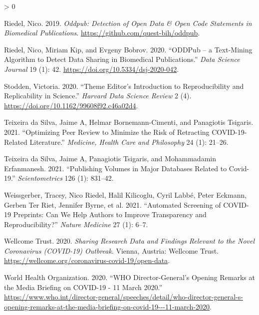 \documentclass[
]{article}
\newlength{\cslhangindent}
\newenvironment{CSLReferences}[2] %
 {%
  \setlength{\parindent}{0pt}
  \ifodd #1 \everypar{\setlength{\hangindent}{\cslhangindent}}\ignorespaces\fi
  \ifnum #2 > 0
  \setlength{\parskip}{#2\baselineskip}
  \fi
 }%
 {}
\begin{document}
\begin{CSLReferences}{1}{0}
\leavevmode\hypertarget{ref-citeODDPubpackage}{}%
Riedel, Nico. 2019. \emph{Oddpub: Detection of Open Data \& Open Code Statements in Biomedical Publications}. \url{https://github.com/quest-bih/oddpub}.

\leavevmode\hypertarget{ref-citePDDPub}{}%
Riedel, Nico, Miriam Kip, and Evgeny Bobrov. 2020. {``ODDPub -- a Text-Mining Algorithm to Detect Data Sharing in Biomedical Publications.''} \emph{Data Science Journal} 19 (1): 42. \url{https://doi.org/10.5334/dsj-2020-042}.

\leavevmode\hypertarget{ref-Stodden2020Theme}{}%
Stodden, Victoria. 2020. {``Theme Editor's Introduction to Reproducibility and Replicability in Science.''} \emph{Harvard Data Science Review} 2 (4). \url{https://doi.org/10.1162/99608f92.c46a02d4}.

\leavevmode\hypertarget{ref-da2021optimizing}{}%
Teixeira da Silva, Jaime A, Helmar Bornemann-Cimenti, and Panagiotis Tsigaris. 2021. {``Optimizing Peer Review to Minimize the Risk of Retracting COVID-19-Related Literature.''} \emph{Medicine, Health Care and Philosophy} 24 (1): 21--26.

\leavevmode\hypertarget{ref-da2021publishing}{}%
Teixeira da Silva, Jaime A, Panagiotis Tsigaris, and Mohammadamin Erfanmanesh. 2021. {``Publishing Volumes in Major Databases Related to Covid-19.''} \emph{Scientometrics} 126 (1): 831--42.

\leavevmode\hypertarget{ref-weissgerber2021automated}{}%
Weissgerber, Tracey, Nico Riedel, Halil Kilicoglu, Cyril Labbé, Peter Eckmann, Gerben Ter Riet, Jennifer Byrne, et al. 2021. {``Automated Screening of COVID-19 Preprints: Can We Help Authors to Improve Transparency and Reproducibility?''} \emph{Nature Medicine} 27 (1): 6--7.

\leavevmode\hypertarget{ref-citeWellcome}{}%
Wellcome Trust. 2020. \emph{Sharing Research Data and Findings Relevant to the Novel Coronavirus (COVID-19) Outbreak}. Vienna, Austria: Wellcome Trust. \url{https://wellcome.org/coronavirus-covid-19/open-data}.

\leavevmode\hypertarget{ref-citeWHOtimeline}{}%
World Health Organization. 2020. {``WHO Director-General's Opening Remarks at the Media Briefing on COVID-19 - 11 March 2020.''} \url{https://www.who.int/director-general/speeches/detail/who-director-general-s-opening-remarks-at-the-media-briefing-on-covid-19---11-march-2020}.

\end{CSLReferences}
\end{document}
